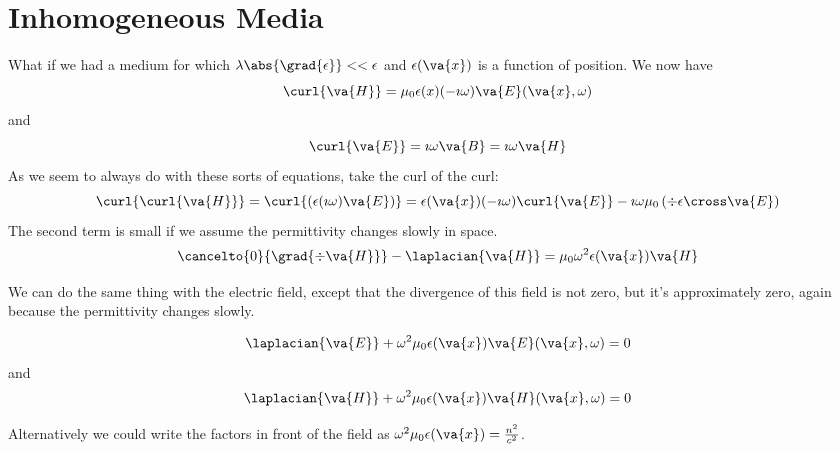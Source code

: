 \documentclass[a4paper,twoside,master.tex]{subfiles}
\begin{document}
\section{Inhomogeneous Media}
\label{sec:inhomogeneous_media}

What if we had a medium for which $ \lambda \abs{\grad{\epsilon}} << \epsilon $ and $ \epsilon(\va{x}) $ is a function of position. We now have
\begin{equation}
    \curl{ \va{H}} = \mu_0 \epsilon(x) (- \imath \omega) \va{E}( \va{x}, \omega)
\end{equation}
and
\begin{equation}
    \curl{ \va{E}} = \imath \omega \va{B} = \imath \omega \va{H}
\end{equation}
As we seem to always do with these sorts of equations, take the curl of the curl:
\begin{equation}
    \curl{\curl{ \va{H}}} = \curl{\left( \epsilon ( \imath \omega) \va{E} \right)} =  \epsilon( \va{x}) (- \imath \omega) \curl{ \va{E}} - \imath \omega \mu_0 \left( \div{\epsilon} \cross \va{E} \right)
\end{equation}
The second term is small if we assume the permittivity changes slowly in space.
\begin{equation}
    \cancelto{0}{\grad{\div{ \va{H}}}} - \laplacian{ \va{H}} = \mu_0 \omega^2 \epsilon( \va{x}) \va{H}
\end{equation}

We can do the same thing with the electric field, except that the divergence of this field is not zero, but it's approximately zero, again because the permittivity changes slowly.

\begin{equation}
    \laplacian{ \va{E}} + \omega^2 \mu_0 \epsilon( \va{x}) \va{E}( \va{x}, \omega) = 0
\end{equation}
and
\begin{equation}
    \laplacian{ \va{H}} + \omega^2 \mu_0 \epsilon( \va{x}) \va{H}( \va{x}, \omega) = 0
\end{equation}

Alternatively we could write the factors in front of the field as $ \omega^2 \mu_0 \epsilon( \va{x}) = \frac{n^2}{c^2} $.
\end{document}
